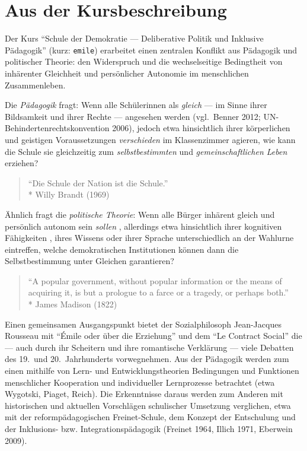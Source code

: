 \section[Kursbeschreibung]{Aus der Kursbeschreibung}

Der Kurs ``Schule der Demokratie --- Deliberative Politik und Inklusive Pädagogik'' (kurz: \lstinline{emile}) erarbeitet einen zentralen Konflikt aus Pädagogik und politischer Theorie:
den Widerspruch und die wechselseitige Bedingtheit von inhärenter Gleichheit und persönlicher Autonomie im menschlichen Zusammenleben.

Die \emph{Pädagogik} fragt:
Wenn alle Schülerinnen als \emph{gleich} --- im Sinne ihrer Bildsamkeit und ihrer Rechte --- angesehen werden (vgl.\ Benner 2012; UN-Behindertenrechtskonvention 2006),
jedoch etwa hinsichtlich ihrer körperlichen und geistigen Voraussetzungen \emph{verschieden} im Klassenzimmer agieren, wie kann die Schule sie gleichzeitig zum \emph{selbstbestimmten} und \emph{gemeinschaftlichen Leben} erziehen?

\begin{quote}
    ``Die Schule der Nation ist die Schule.''\\*
    Willy Brandt (1969)
\end{quote}

Ähnlich fragt die \emph{politische Theorie}:
Wenn alle Bürger inhärent gleich und persönlich autonom sein \emph{sollen} \parencite[etwa][]{Dahl-1989-aa}, allerdings etwa hinsichtlich ihrer kognitiven Fähigkeiten \parencite{Rosenberg-2002-aa}, ihres Wissens \parencite[etwa][]{Converse-1970-aa} oder ihrer Sprache unterschiedlich an der Wahlurne eintreffen, welche demokratischen Institutionen können dann die Selbstbestimmung unter Gleichen garantieren?

\begin{quote}
    ``A popular government, without popular information or the means of acquiring it, is but a prologue to a farce or a tragedy, or perhaps both.''\\*
    James Madison (1822)
\end{quote}

Einen gemeinsamen Ausgangspunkt bietet der Sozialphilosoph Jean-Jacques Rousseau mit ``Émile oder über die Erziehung'' \parencite{Rousseau1762} und dem ``Le Contract Social'' \parencite{Rousseau-1762-b} die --- auch durch ihr Scheitern und ihre romantische Verklärung --- viele Debatten des 19.\ und 20.\ Jahrhunderts vorwegnehmen.
Aus der Pädagogik werden zum einen mithilfe von Lern- und Entwicklungstheorien Bedingungen und Funktionen menschlicher Kooperation und individueller Lernprozesse betrachtet (etwa Wygotski, Piaget, Reich).
Die Erkenntnisse daraus werden zum Anderen mit historischen und aktuellen Vorschlägen schulischer Umsetzung verglichen, etwa mit der reformpädagogischen Freinet-Schule, dem Konzept der Entschulung und der Inklusions- bzw. Integrationspädagogik (Freinet 1964, Illich 1971, Eberwein 2009).

